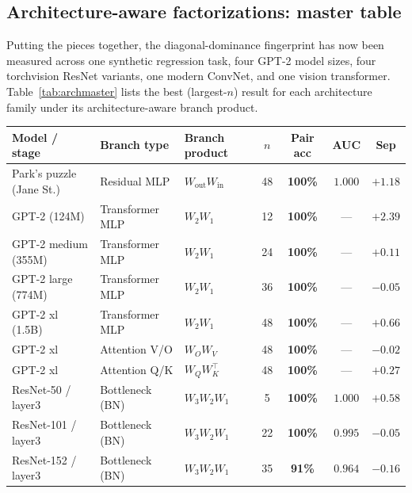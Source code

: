 \documentclass[10pt]{article}
\theoremstyle{remark}
\begin{document}
\subsection{Architecture-aware factorizations: master table}

Putting the pieces together, the diagonal-dominance fingerprint has now
been measured across one synthetic regression task, four GPT-2 model
sizes, four torchvision ResNet variants, one modern ConvNet, and one
vision transformer. Table~\ref{tab:archmaster} lists the best
(largest-$n$) result for each architecture family under its
architecture-aware branch product.

\begin{table}[H]
\centering
\small
\setlength{\tabcolsep}{4pt}
\renewcommand{\arraystretch}{1.15}
\begin{tabular}{lllcccc}
\toprule
Model / stage & Branch type & Branch product & $n$ & Pair acc & AUC & Sep \\
\midrule
Park's puzzle (Jane St.)   & Residual MLP        & $W_{\mathrm{out}} W_{\mathrm{in}}$ & 48 & \textbf{100\%} & $1.000$ & $+1.18$ \\
\midrule
GPT-2 (124M)               & Transformer MLP     & $W_2 W_1$                          & 12 & \textbf{100\%} & ---     & $+2.39$ \\
GPT-2 medium (355M)        & Transformer MLP     & $W_2 W_1$                          & 24 & \textbf{100\%} & ---     & $+0.11$ \\
GPT-2 large (774M)         & Transformer MLP     & $W_2 W_1$                          & 36 & \textbf{100\%} & ---     & $-0.05$ \\
GPT-2 xl (1.5B)            & Transformer MLP     & $W_2 W_1$                          & 48 & \textbf{100\%} & ---     & $+0.66$ \\
GPT-2 xl                   & Attention V/O       & $W_O W_V$                          & 48 & \textbf{100\%} & ---     & $-0.02$ \\
GPT-2 xl                   & Attention Q/K       & $W_Q W_K^\top$                     & 48 & \textbf{100\%} & ---     & $+0.27$ \\
\midrule
ResNet-50 / layer3         & Bottleneck (BN)     & $W_3 W_2 W_1$                      &  5 & \textbf{100\%} & $1.000$ & $+0.58$ \\
ResNet-101 / layer3        & Bottleneck (BN)     & $W_3 W_2 W_1$                      & 22 & \textbf{100\%} & $0.995$ & $-0.05$ \\
ResNet-152 / layer3        & Bottleneck (BN)     & $W_3 W_2 W_1$                      & 35 & \textbf{91\%}  & $0.964$ & $-0.16$ \\

\end{tabular}
\end{table}
\end{document}
